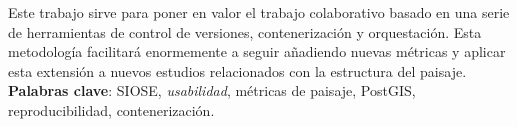 \begin{resumen}
Este trabajo sirve para poner en valor el trabajo colaborativo basado en una serie de herramientas de control de versiones, contenerización y orquestación. Esta metodología facilitará enormemente a seguir añadiendo nuevas métricas y aplicar esta extensión a nuevos estudios relacionados con la estructura del paisaje.\\


\textbf{Palabras clave}: SIOSE, \textit{usabilidad}, métricas de paisaje, PostGIS, reproducibilidad, contenerización.


\end{resumen}
